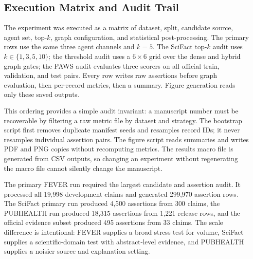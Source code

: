\documentclass{ieeeaccess}
\begin{document}
\subsection{Execution Matrix and Audit Trail}
The experiment was executed as a matrix of dataset, split, candidate source, agent set, top-$k$, graph configuration, and statistical post-processing. The primary rows use the same three agent channels and $k=5$. The SciFact top-$k$ audit uses $k\in\{1,3,5,10\}$; the threshold audit uses a $6\times6$ grid over the dense and hybrid graph gates; the PAWS audit evaluates three scorers on all official train, validation, and test pairs. Every row writes raw assertions before graph evaluation, then per-record metrics, then a summary. Figure generation reads only these saved outputs.

This ordering provides a simple audit invariant: a manuscript number must be recoverable by filtering a raw metric file by dataset and strategy. The bootstrap script first removes duplicate manifest seeds and resamples record IDs; it never resamples individual assertion pairs. The figure script reads summaries and writes PDF and PNG copies without recomputing metrics. The results macro file is generated from CSV outputs, so changing an experiment without regenerating the macro file cannot silently change the manuscript.

The primary FEVER run required the largest candidate and assertion audit. It processed all 19,998 development claims and generated 299,970 assertion rows. The SciFact primary run produced 4,500 assertions from 300 claims, the PUBHEALTH run produced 18,315 assertions from 1,221 release rows, and the official evidence subset produced 495 assertions from 33 claims. The scale difference is intentional: FEVER supplies a broad stress test for volume, SciFact supplies a scientific-domain test with abstract-level evidence, and PUBHEALTH supplies a noisier source and explanation setting.

\begin{table}[!ht]
\centering
\caption{Executed primary campaign and wall-clock observations.}
\label{tab:runtime}
\end{table}
\end{document}

